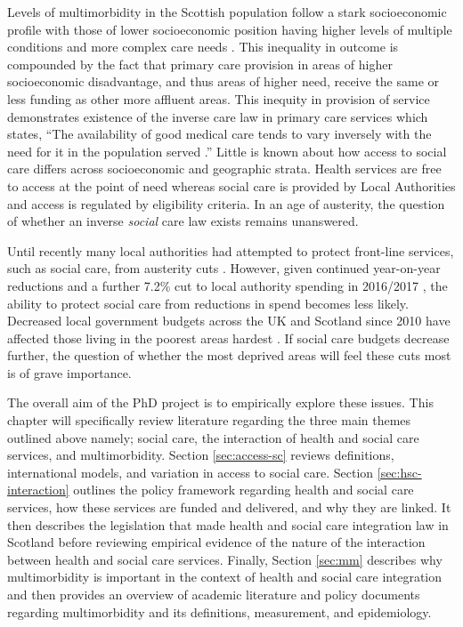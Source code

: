 \documentclass[12pt,]{report}
\begin{document}
Levels of multimorbidity in the Scottish population follow a stark
socioeconomic profile with those of lower socioeconomic position having
higher levels of multiple conditions and more complex care needs
\citep{RN33, RN21}. This inequality in outcome is compounded by the fact
that primary care provision in areas of higher socioeconomic
disadvantage, and thus areas of higher need, receive the same or less
funding as other more affluent areas. This inequity in provision of
service demonstrates existence of the inverse care law in primary care
services \citep{RN120, RN39, RN148} which states, ``The availability of
good medical care tends to vary inversely with the need for it in the
population served \citep{RN120}.'' Little is known about how access to
social care differs across socioeconomic and geographic strata. Health
services are free to access at the point of need whereas social care is
provided by Local Authorities and access is regulated by eligibility
criteria. In an age of austerity, the question of whether an inverse
\emph{social} care law exists remains unanswered.

Until recently many local authorities had attempted to protect
front-line services, such as social care, from austerity cuts
\citep{RN117}. However, given continued year-on-year reductions and a
further 7.2\% cut to local authority spending in 2016/2017
\citep{RN251}, the ability to protect social care from reductions in
spend becomes less likely. Decreased local government budgets across the
UK and Scotland since 2010 have affected those living in the poorest
areas hardest \citep{RN117, RN235}. If social care budgets decrease
further, the question of whether the most deprived areas will feel these
cuts most is of grave importance.

The overall aim of the PhD project is to empirically explore these
issues. This chapter will specifically review literature regarding the
three main themes outlined above namely; social care, the interaction of
health and social care services, and multimorbidity. Section
\ref{sec:access-sc} reviews definitions, international models, and
variation in access to social care. Section \ref{sec:hsc-interaction}
outlines the policy framework regarding health and social care services,
how these services are funded and delivered, and why they are linked. It
then describes the legislation that made health and social care
integration law in Scotland before reviewing empirical evidence of the
nature of the interaction between health and social care services.
Finally, Section \ref{sec:mm} describes why multimorbidity is important
in the context of health and social care integration and then provides
an overview of academic literature and policy documents regarding
multimorbidity and its definitions, measurement, and epidemiology.
\end{document}
